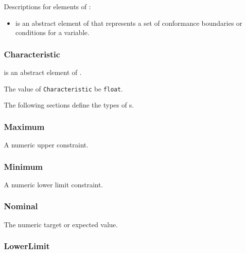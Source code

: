 Descriptions for elements of :

\begin{itemize}

\item {} \newline {} is an abstract element of  that represents a set of conformance boundaries or conditions for a variable.
\end{itemize}



\subsubsection{Characteristic}
\label{sec:Characteristic}



 is an abstract element of .


The value of \texttt{Characteristic} \MUST be \texttt{float}.

The following sections define the types of s.

\subsubsection{Maximum}
\label{sec:Maximum}



A numeric upper constraint.




\subsubsection{Minimum}
\label{sec:Minimum}



A numeric lower limit constraint.



\subsubsection{Nominal}
\label{sec:Nominal}



The numeric target or expected value.



\subsubsection{LowerLimit}
\label{sec:LowerLimit}



